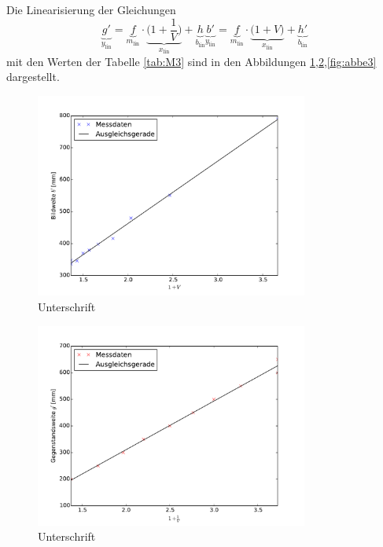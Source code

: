 Die Linearisierung der Gleichungen
\begin{subequations}
\begin{equation}
	\underbrace{g'}_{y_\text{lin}}=\underbrace{f}_{m_\text{lin}}\cdot\underbrace{\bigl(1+\frac{1}{V}\bigr)}_{x_\text{lin}}+\underbrace{h}_{b_\text{lin}}
	\end{equation}
	\begin{equation}
	\underbrace{b'}_{y_\text{lin}}=\underbrace{f}_{m_\text{lin}}\cdot\underbrace{\bigl(1+V\bigr)}_{x_\text{lin}}+\underbrace{h'}_{b_\text{lin}}
\end{equation}
\end{subequations}
 mit den Werten der Tabelle \ref{tab:M3} sind in den Abbildungen \ref{fig:abbe1},\ref{fig:abbe2},\ref{fig:abbe3} dargestellt.

\begin{figure}[p]
	\centering
	\includegraphics[width=0.8\textwidth]{Bilder/Abbe.pdf}
	\caption{Unterschrift}
	\label{fig:abbe1}
\end{figure}
\begin{figure}[p]
	\centering
	\includegraphics[width=0.8\textwidth]{Bilder/Abbe1.pdf}
	\caption{Unterschrift}
	\label{fig:abbe2}
\end{figure}
